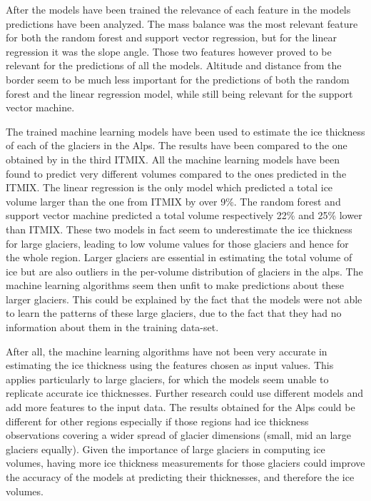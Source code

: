 After the models have been trained the relevance of each feature in the models predictions have been analyzed. The mass balance was the most relevant feature for both the random forest and support vector regression, but for the linear regression it was the slope angle. Those two features however proved to be relevant for the predictions of all the models. Altitude and distance from the border seem to be much less important for the predictions of both the random forest and the linear regression model, while still being relevant for the support vector machine.

The trained machine learning models have been used to estimate the ice thickness of each of the glaciers in the Alps. The results have been compared to the one obtained by \citet{Farinotti2019} in the third ITMIX. All the machine learning models have been found to predict very different volumes compared to the ones predicted in the ITMIX. The linear regression is the only model which predicted a total ice volume larger than the one from ITMIX by over 9\%. The random forest and support vector machine predicted a total volume respectively 22\% and 25\% lower than ITMIX. These two models in fact seem to underestimate the ice thickness for large glaciers, leading to low volume values for those glaciers and hence for the whole region. Larger glaciers are essential in estimating the total volume of ice but are also outliers in the per-volume distribution of glaciers in the alps. The machine learning algorithms seem then unfit to make predictions about these larger glaciers. This could be explained by the fact that the models were not able to learn the patterns of these large glaciers, due to the fact that they had no information about them in the training data-set. 

After all, the machine learning algorithms have not been very accurate in estimating the ice thickness using the features chosen as input values. This applies particularly to large glaciers, for which the models seem unable to replicate accurate ice thicknesses.
Further research could use different models and add more features to the input data.
The results obtained for the Alps could be different for other regions especially if those regions had ice thickness observations covering a wider spread of glacier dimensions (small, mid an large glaciers equally).
Given the importance of large glaciers in computing ice volumes, having more ice thickness measurements for those glaciers could improve the accuracy of the models at predicting their thicknesses, and therefore the ice volumes.
